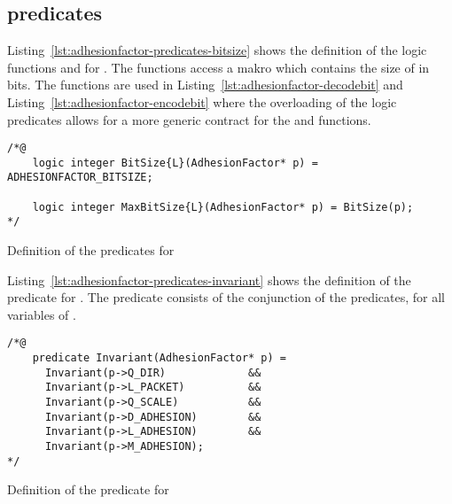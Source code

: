 \subsection{\acsl predicates \adhesion}
\label{sec:adhesionfactor-predicates-bitsize}

Listing~\ref{lst:adhesionfactor-predicates-bitsize} shows the definition of
the logic functions  and  for \adhesion.
The functions access a makro which contains the size of \adhesion in bits.
The functions are used in Listing~\ref{lst:adhesionfactor-decodebit} and
Listing~\ref{lst:adhesionfactor-encodebit} where the overloading of the
logic predicates allows for a more generic \acsl contract for the  and
 functions.

\begin{listing}[hbt]
\begin{minipage}{0.99\textwidth}
\begin{lstlisting}[style=acsl-block]
/*@
    logic integer BitSize{L}(AdhesionFactor* p) = ADHESIONFACTOR_BITSIZE;

    logic integer MaxBitSize{L}(AdhesionFactor* p) = BitSize(p);
*/
\end{lstlisting}
\end{minipage}
\caption{\label{lst:adhesionfactor-predicates-bitsize}Definition of the  predicates for \adhesion}
\end{listing}

\FloatBarrier

Listing~\ref{lst:adhesionfactor-predicates-invariant} shows the definition of the  predicate
for \adhesion. The predicate consists of the conjunction of the  predicates,
for all variables of \adhesion.


\begin{listing}[hbt]
\begin{minipage}{0.99\textwidth}
\begin{lstlisting}[style=acsl-block]
/*@
    predicate Invariant(AdhesionFactor* p) =
      Invariant(p->Q_DIR)             &&
      Invariant(p->L_PACKET)          &&
      Invariant(p->Q_SCALE)           &&
      Invariant(p->D_ADHESION)        &&
      Invariant(p->L_ADHESION)        &&
      Invariant(p->M_ADHESION);
*/
\end{lstlisting}
\end{minipage}
\caption{\label{lst:adhesionfactor-predicates-invariant}Definition of the  predicate for \adhesion}
\end{listing}

